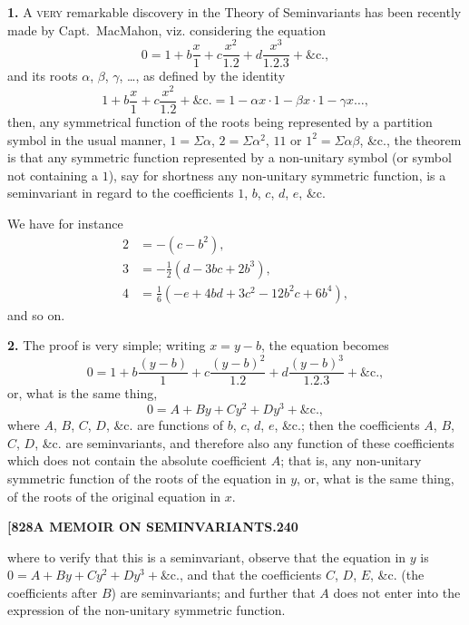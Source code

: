 \documentclass[11pt,a4paper]{book}
\begin{document}
\noindent\textbf{1.} A \textsc{very} remarkable discovery in the Theory of Seminvariants has been recently made by Capt.~MacMahon, viz. considering the equation
\[
0 = 1 + b\frac{x}{1} + c\frac{x^2}{1.2} + d\frac{x^3}{1.2.3} + \&\text{c.},
\]
and its roots $\alpha$, $\beta$, $\gamma$, \dots, as defined by the identity
\[
1 + b\frac{x}{1} + c\frac{x^2}{1.2} + \&\text{c.} = 1 - \alpha x \cdot 1 - \beta x \cdot 1 - \gamma x \dots,
\]
then, any symmetrical function of the roots being represented by a partition symbol in the usual manner, $1 = \Sigma\alpha$, $2 = \Sigma\alpha^2$, $11$ or $1^2 = \Sigma\alpha\beta$, \&c., the theorem is that any symmetric function represented by a non-unitary symbol (or symbol not containing a $1$), say for shortness any non-unitary symmetric function, is a seminvariant in regard to the coefficients $1$, $b$, $c$, $d$, $e$, \&c.

We have for instance
\begin{align*}
2 &= -(c - b^2), \\
3 &= -\tfrac{1}{2}(d - 3bc + 2b^3), \\
4 &= \tfrac{1}{6}(-e + 4bd + 3c^2 - 12b^2c + 6b^4),
\end{align*}
and so on.

\noindent\textbf{2.} The proof is very simple; writing $x = y - b$, the equation becomes
\[
0 = 1 + b\frac{(y-b)}{1} + c\frac{(y-b)^2}{1.2} + d\frac{(y-b)^3}{1.2.3} + \&\text{c.},
\]
or, what is the same thing,
\[
0 = A + By + Cy^2 + Dy^3 + \&\text{c.},
\]
where $A$, $B$, $C$, $D$, \&c. are functions of $b$, $c$, $d$, $e$, \&c.; then the coefficients $A$, $B$, $C$, $D$, \&c. are seminvariants, and therefore also any function of these coefficients which does not contain the absolute coefficient $A$; that is, any non-unitary symmetric function of the roots of the equation in $y$, or, what is the same thing, of the roots of the original equation in $x$.

\newpage
\setcounter{page}{240}

\noindent\textbf{[828}\hfill\textbf{A MEMOIR ON SEMINVARIANTS.}\hfill\textbf{240}

\bigskip

\noindent where to verify that this is a seminvariant, observe that the equation in $y$ is $0 = A + By + Cy^2 + Dy^3 + \&\text{c.}$, and that the coefficients $C$, $D$, $E$, \&c. (the coefficients after $B$) are seminvariants; and further that $A$ does not enter into the expression of the non-unitary symmetric function.
\end{document}
